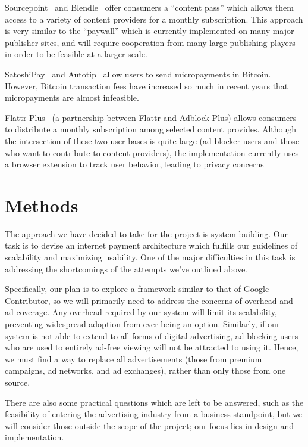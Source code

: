 \documentclass[letterpaper,twocolumn,10pt]{article}
\begin{document}
Sourcepoint~\cite{sourcepoint} and Blendle~\cite{blendle} offer consumers a
“content pass” which allows them access to a variety of content
providers for a monthly subscription. This approach is very similar to
the “paywall” which is currently implemented on many major publisher
sites, and will require cooperation from many large publishing players
in order to be feasible at a larger scale.

SatoshiPay~\cite{satoshi} and Autotip~\cite{autotip} allow users to
send micropayments in Bitcoin. However, Bitcoin transaction fees have
increased so much in recent years that micropayments are almost
infeasible.

Flattr Plus~\cite{flattrplus} (a partnership between Flattr and
Adblock Plus) allows consumers to distribute a monthly subscription
among selected content provides. Although the intersection of these
two user bases is quite large (ad-blocker users and those who want to
contribute to content providers), the implementation currently uses a
browser extension to track user behavior, leading to privacy concerns

\section{Methods}
The approach we have decided to take for the project is
system-building. Our task is to devise an internet payment
architecture which fulfills our guidelines of scalability and
maximizing usability. One of the major difficulties in this task is
addressing the shortcomings of the attempts we've outlined above.

Specifically, our plan is to explore a framework similar to that of
Google Contributor, so we will primarily need to address the concerns of
overhead and ad coverage. Any overhead required by our system will
limit its scalability, preventing widespread adoption from ever being
an option. Similarly, if our system is not able to extend to all forms
of digital advertising, ad-blocking users who are used to entirely
ad-free viewing will not be attracted to using it. Hence, we must find a
way to replace all advertisements (those from premium campaigns, ad
networks, and ad exchanges), rather than only those from one source.

There are also some practical questions which are left to be answered,
such as the feasibility of entering the advertising industry from a
business standpoint, but we will consider those outside the scope of
the project; our focus lies in design and implementation.

{\footnotesize 
}

\end{document}
